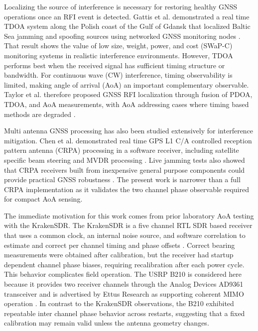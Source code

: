 \documentclass[conference]{IEEEtran}
\begin{document}
Localizing the source of interference is necessary for restoring healthy GNSS operations once an RFI event is detected. Gattis et al. demonstrated a real time TDOA system along the Polish coast of the Gulf of Gdansk that localized Baltic Sea jamming and spoofing sources using networked GNSS monitoring nodes \cite{gattis2026baltic}. That result shows the value of low size, weight, power, and cost (SWaP-C) monitoring systems in realistic interference environments. However, TDOA performs best when the received signal has sufficient timing structure or bandwidth. For continuous wave (CW) interference, timing observability is limited, making angle of arrival (AoA) an important complementary observable. Taylor et al. therefore proposed GNSS RFI localization through fusion of PDOA, TDOA, and AoA measurements, with AoA addressing cases where timing based methods are degraded \cite{taylor2024fusion}.

Multi antenna GNSS processing has also been studied extensively for interference mitigation. Chen et al. demonstrated real time GPS L1 C/A controlled reception pattern antenna (CRPA) processing in a software receiver, including satellite specific beam steering and MVDR processing \cite{chen2010realtime}. Live jamming tests also showed that CRPA receivers built from inexpensive general purpose components could provide practical GNSS robustness \cite{chen2013validation}. The present work is narrower than a full CRPA implementation as it validates the two channel phase observable required for compact AoA sensing.

The immediate motivation for this work comes from prior laboratory AoA testing with the KrakenSDR. The KrakenSDR is a five channel RTL SDR based receiver that uses a common clock, an internal noise source, and software correlation to estimate and correct per channel timing and phase offsets \cite{krakensdrDocs}. Correct bearing measurements were obtained after calibration, but the receiver had startup dependent channel phase biases, requiring recalibration after each power cycle. This behavior complicates field operation. The USRP B210 is considered here because it provides two receiver channels through the Analog Devices AD9361 transceiver and is advertised by Ettus Research as supporting coherent MIMO operation \cite{ettusB210,ad9361}. In contrast to the KrakenSDR observations, the B210 exhibited repeatable inter channel phase behavior across restarts, suggesting that a fixed calibration may remain valid unless the antenna geometry changes.
\end{document}
